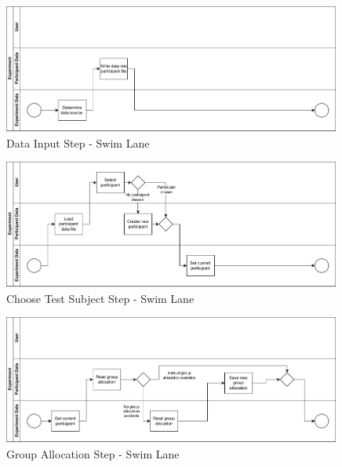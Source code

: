 \begin{figure}[]
    \centering
    \includegraphics[width=0.99\textwidth, keepaspectratio]{content/05_design_and_dev_artefacts/DataInputSwimLane.drawio.pdf}
    \caption{Data Input Step - Swim Lane}    
    \label{fig:DataInputSwimLane}
\end{figure}



\begin{figure}[]
    \centering
    \includegraphics[width=0.99\textwidth, keepaspectratio]{content/05_design_and_dev_artefacts/ChooseTestSubjectSwimLane.drawio.pdf}
    \caption{Choose Test Subject Step - Swim Lane}    
    \label{fig:ChooseTestSubjectSwimLane}
\end{figure}



\begin{figure}[]
    \centering
    \includegraphics[width=0.99\textwidth, keepaspectratio]{content/05_design_and_dev_artefacts/GroupAllocationSwimLane.drawio.pdf}
    \caption{Group Allocation Step - Swim Lane}    
    \label{fig:groupAllocationSwimLane}
\end{figure}

